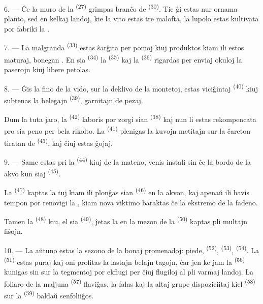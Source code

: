 \VUsaut{6.0mm}
\VUsaut{3.4mm}

6. --- Ĉe la muro de la  \textsuperscript{(27)} grimpas branĉo de
 \textsuperscript{(30)}. Tie ĝi estas nur ornama planto, sed en
kelkaj landoj, kie la vito estas tre malofta, la lupolo estas kultivata por
fabriki la .

7. --- La malgranda  \textsuperscript{(33)} estas ŝarĝita per
pomoj kiuj produktos kiam ili estos maturaj, bonegan . En sia
 \textsuperscript{(34)} la  \textsuperscript{(35)}
kaj la  \textsuperscript{(36)} rigardas per enviaj okuloj la
paserojn kiuj libere petolas.

8. --- Ĝis la fino de la vido, sur la deklivo de la montetoj, estas viciĝintaj
 \textsuperscript{(40)} kiuj subtenas la belegajn
 \textsuperscript{(39)}, garnitajn de 
pezaj.

Dum la tuta jaro, la  \textsuperscript{(42)} laboris por
zorgi sian  \textsuperscript{(38)} kaj nun li estas
rekompencata pro sia peno per bela rikolto. La 
\textsuperscript{(41)} plenigas la kuvojn metitajn sur la ĉareton tiratan de
 \textsuperscript{(43)}, kaj ĉiuj estas ĝojaj.

\VUsaut{5.0mm}
\VUsaut{3.4mm}

9. --- Same estas pri la  \textsuperscript{(44)} kiuj de
la mateno, venis instali sin ĉe la bordo de la akvo kun siaj
 \textsuperscript{(45)}.

La  \textsuperscript{(47)} kaptas la  tuj kiam ili
plonĝas sian  \textsuperscript{(46)} en la akvon, kaj apenaŭ
ili havis tempon por renovigi la , kiam nova viktimo baraktas
ĉe la ekstremo de la fadeno.

Tamen la  \textsuperscript{(48)} kiu, el sia 
\textsuperscript{(49)}, ĵetas la  en la mezon de la
 \textsuperscript{(50)} kaptas pli multajn fiŝojn.

10. --- La aŭtuno estas la sezono de la bonaj promenadoj: piede,
 \textsuperscript{(52)},  \textsuperscript{(53)},
 \textsuperscript{(54)}. La 
\textsuperscript{(51)} estas puraj kaj oni profitas la lastajn belajn tagojn,
ĉar jen ke jam la  \textsuperscript{(56)} kunigas sin sur la
tegmentoj por ekflugi per ĉiuj flugiloj al pli varmaj landoj. La foliaro de la
maljuna  \textsuperscript{(57)} flaviĝas, la
 falas kaj la altaj  grupe dispoziciitaj kiel
 \textsuperscript{(58)} sur la 
\textsuperscript{(59)} baldaŭ senfoliiĝos.

